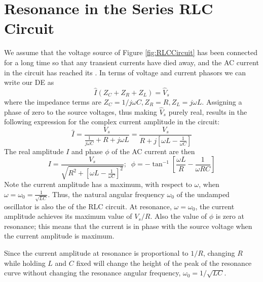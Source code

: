 \section{Resonance in the Series RLC Circuit}

We assume that the voltage source of Figure \ref{fig:RLCCircuit} has been connected for a long time so that any transient currents have died away, and the AC current in the circuit has reached its . In terms of voltage and current phasors we can write our DE as \begin{equation*}
    \hat{I}(Z_C+Z_R+Z_L) = \hat{V}_s
\end{equation*}
where the impedance terms are $Z_C = 1/j\omega C, Z_R = R, Z_L = j\omega L$. Assigning a phase of zero to the source voltages, thus making $\hat{V}_s$ purely real, results in the following expression for the complex current amplitude in the circuit: \begin{equation*}
    \hat{I} = \frac{V_s}{\frac{1}{j\omega C}+R+j\omega L} = \frac{V_s}{R + j\left[\omega L - \frac{1}{\omega C}\right]}
\end{equation*}
The real amplitude $I$ and phase $\phi$ of the AC current are then \begin{equation*}
    I = \frac{V_s}{\sqrt{R^2 + \left[\omega L - \frac{1}{\omega C}\right]^2}};\;\;\phi = -\tan^{-1}\left[\frac{\omega L}{R} - \frac{1}{\omega RC}\right]
\end{equation*}
Note the current amplitude has a maximum, with respect to $\omega$, when $\omega = \omega_0 = \frac{1}{\sqrt{LC}}$. Thus, the natural angular frequency $\omega_0$ of the undamped oscillator is also the  of the RLC circuit. At resonance, $\omega = \omega_0$, the current amplitude achieves its maximum value of $V_s/R$. Also the value of $\phi$ is zero at resonance; this means that the current is in phase with the source voltage when the current amplitude is maximum.

Since the current amplitude at resonance is proportional to $1/R$, changing $R$ while holding $L$ and $C$ fixed will change the height of the peak of the resonance curve without changing the resonance angular frequency, $\omega_0 = 1/\sqrt{LC}$.

